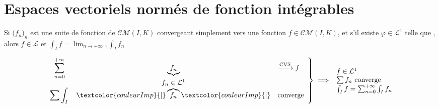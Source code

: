 \documentclass[11pt,a4paper,fleqn,pdftex]{report}
\begin{document}
\section{Espaces vectoriels normés de fonction intégrables}
\begin{itheorem}
    Si $\big( f_n \big)_n$ est une suite de fonction de $\mathcal{CM}(I,K) $ convergeant simplement vers une fonction $f \in \mathcal{CM}(I,K)$, et s'il existe $\varphi \in \mathcal{L}^1 $ telle que ,\newline
    alors $f \in \mathcal{L}$ et $\int_I f = \lim_{n \to +\infty}, \int_I f_n$
\end{itheorem}
\begin{itheorem}
    \begin{equation}
        \displaystyle
        \left.
        \begin{array}{c c l}
        \displaystyle\sum_{n=0}^{+\infty} & \underbrace{f_n} & \xrightarrow{\text{CVS}} f \\
                     & f_n \in \mathcal{L}^1 & \\
        \displaystyle\sum  \int_I \vphantom{\overbrace{f_n}} & \textcolor{couleurImp}{|}\overbrace{f_n}\textcolor{couleurImp}{|} & \text{converge}
        \end{array}
        \right\rbrace 
        \implies 
        \begin{array}{l}
        f \in \mathcal{L}^1 \\
        \sum f_n \text{ converge} \\
        \int_I f = \sum_{n=0}^{+\infty} \int_I f_n
        \end{array}
    \end{equation}
\end{itheorem}
\end{document}
